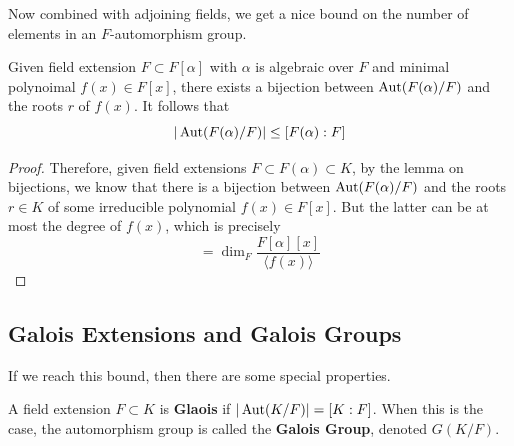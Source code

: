   Now combined with adjoining fields, we get a nice bound on the number of elements in an $F$-automorphism group. 

  \begin{corollary}
    Given field extension $F \subset F[\alpha]$ with $\alpha$ is algebraic over $F$ and minimal polynoimal $f(x) \in F[x]$, there exists a bijection between $\operatorname{Aut}(F(\alpha)/F)$ and the roots $r$ of $f(x)$. It follows that 
    \begin{equation}
      |\operatorname{Aut}(F(\alpha)/F)| \leq [F(\alpha):F]
    \end{equation}
  \end{corollary}
  \begin{proof}
    Therefore, given field extensions $F \subset F(\alpha) \subset K$, by the lemma on bijections, we know that there is a bijection between $\operatorname{Aut}(F(\alpha)/F)$ and the roots $r \in K$ of some irreducible polynomial $f(x) \in F[x]$. But the latter can be at most the degree of $f(x)$, which is precisely 
    \begin{equation}
      [F(\alpha):F] = \dim_F \frac{F[\alpha][x]}{\langle f(x) \rangle}
    \end{equation}
  \end{proof}

\subsection{Galois Extensions and Galois Groups}

  If we reach this bound, then there are some special properties. 

  \begin{definition}
    A field extension $F \subset K$ is \textbf{Glaois} if $|\operatorname{Aut}(K/F)| = [K:F]$. When this is the case, the automorphism group is called the \textbf{Galois Group}, denoted $G(K/F)$. 
  \end{definition}

